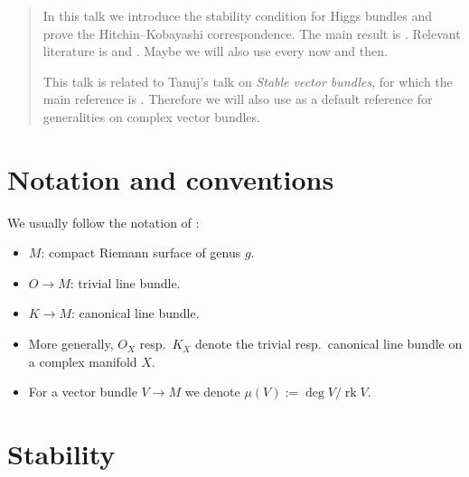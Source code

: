 \documentclass[A4paper, 12pt, british, reqno]{amsart}
\DeclareMathOperator{\rk}{rk}
\begin{document}
\maketitle

\begin{abstract}
    In this talk we introduce the stability condition for Higgs bundles and prove the Hitchin--Kobayashi correspondence.
    The main result is \cite[Theorem 4.3]{hit87a}.
    Relevant literature is \cite[\S 3 and \S 4]{hit87a} and \cite[\S 2 and \S 3]{wen14}.
    Maybe we will also use \cite{wen16} every now and then.

    This talk is related to Tanuj's talk on \textit{Stable vector bundles}, for which the main reference is \cite{kob87}.
    Therefore we will also use \cite{kob87} as a default reference for generalities on complex vector bundles.
\end{abstract}

\tableofcontents

\section*{Notation and conventions}

We usually follow the notation of \cite{hit87a}:
\begin{itemize}
    \item $M$: compact Riemann surface of genus $g$.
    \item $O\to M$: trivial line bundle.
    \item $K\to M$: canonical line bundle.
    \item More generally, $O_{X}$ resp.~$K_{X}$ denote the trivial resp.~canonical line bundle on a complex manifold $X$.
    \item For a vector bundle $V\to M$ we denote $\mu(V):=\deg{V}/\rk{V}$.
\end{itemize}

\section{Stability}


%
%
%
\end{document}
